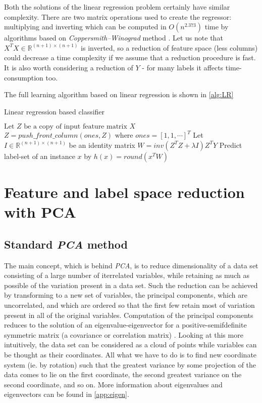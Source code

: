 Both the solutions of the linear regression problem certainly have similar complexity. There are two matrix operations used to create the regressor: multiplying and inverting which can be computed in $O(n^{2.373})$ time by algorithms based on \textit{Coppersmith–Winograd} method \cite{VVW}. Let us note that $X^TX \in \mathbb{R}^{(n+1) \times (n+1)}$ is inverted, so a reduction of feature space (less columns) could decrease a time complexity if we assume that a reduction procedure is fast. It is also worth considering a reduction of $Y$ - for many labels it affects time-consumption too. 

The full learning algorithm based on linear regression is shown in \cref{alg:LR} 

\begin{algorithm}
    \caption{Linear regression based classifier}\label{alg:LR}
    \begin{algorithmic}[1]
    \State $\text{Let } Z \text{ be a copy of input feature matrix } X$
    \State $Z=push\_front\_column(ones, Z) \text{ where } ones=[1, 1, \cdots]^T$
    \State Let $I \in \mathbb{R}^{(n+1) \times (n+1)}$ be an identity matrix
    \State $W=inv(Z^TZ+\lambda I)Z^TY$
    \State Predict label-set of an instance $x$ by $h(x)=round(x^TW)$ 
    \end{algorithmic}
\end{algorithm}


\section{Feature and label space reduction with PCA}

\subsection{Standard \textit{PCA} method}

The main concept, which is behind \textit{PCA}, is to reduce dimensionality of a data set consisting of a large number of iterrelated variables, while retaining as much as possible of the variation present in a data set. Such the reduction can be achieved by transforming to a new set of variables, the principal components, which are uncorrelated, and which are ordered so that the first few retain most of variation present in all of the original variables. Computation of the principal components reduces to the solution of an eigenvalue-eigenvector for a positive-semifdefinite symmetric matrix (a covariance or correlation matrix) \cite{Jolliffe}. Looking at this more intuitively, the data set can be considered as a cloud of points while variables can be thought as their coordinates. All what we have to do is to find new coordinate system (ie. by rotation) such that the greatest variance by some projection of the data comes to lie on the first coordinate, the second greatest variance on the second coordinate, and so on. More information about eigenvalues and eigenvectors can be found in \cref{app:eigen}. 

